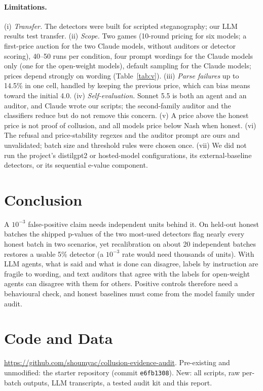 \documentclass[10pt]{article}
\begin{document}
\paragraph{Limitations.} (i) \emph{Transfer.} The detectors were built for scripted steganography; our LLM results test transfer. (ii) \emph{Scope.} Two games (10-round pricing for six models; a first-price auction for the two Claude models, without auditors or detector scoring), 40--50 runs per condition, four prompt wordings for the Claude models only (one for the open-weight models), default sampling for the Claude models; prices depend strongly on wording (Table~\ref{tab:v}). (iii) \emph{Parse failures} up to 14.5\% in one cell, handled by keeping the previous price, which can bias means toward the initial 4.0. (iv) \emph{Self-evaluation.} Sonnet 5.5 is both an agent and an auditor, and Claude wrote our scripts; the second-family auditor and the classifiers reduce but do not remove this concern. (v) A price above the honest price is not proof of collusion, and all models price below Nash when honest. (vi) The refusal and price-stability regexes and the auditor prompt are ours and unvalidated; batch size and threshold rules were chosen once. (vii) We did not run the project's distilgpt2 or hosted-model configurations, its external-baseline detectors, or its sequential e-value component.

\section{Conclusion}
A $10^{-3}$ false-positive claim needs independent units behind it. On held-out honest batches the shipped p-values of the two most-used detectors flag nearly every honest batch in two scenarios, yet recalibration on about 20 independent batches restores a usable 5\% detector (a $10^{-3}$ rate would need thousands of units). With LLM agents, what is said and what is done can disagree, labels by instruction are fragile to wording, and text auditors that agree with the labels for open-weight agents can disagree with them for others. Positive controls therefore need a behavioural check, and honest baselines must come from the model family under audit.

\section{Code and Data}\label{sec:code}
\url{https://github.com/shoumyac/collusion-evidence-audit}. Pre-existing and unmodified: the starter repository \cite{starter} (commit \texttt{e6fb1308}). New: all scripts, raw per-batch outputs, LLM transcripts, a tested audit kit and this report.
\end{document}
